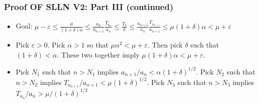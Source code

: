 \documentclass[handout]{beamer}
\newcommand{\BP}{\mathbf{P}}
\begin{document}
\frame
{
  \frametitle{Proof OF SLLN V2: Part III (continued)}

   \begin{itemize}
        
  \item<1->[-] Goal:       $\mu - \varepsilon \le \frac{\mu}{(1+\delta)\alpha} \le \frac{a_n}{a_{n+1}}\frac{T_{a_n}}{a_{n}} \leq \frac{T_{k}}{k}\leq  \frac{a_{n+1}}{a_{n}}\frac{T_{a_{n+1}}}{a_{n+1}} \le \mu(1+\delta)\alpha < \mu + \varepsilon$
  
  \item<2->[-] Pick $\varepsilon > 0$. Pick $\alpha > 1$ so that $\mu\alpha^2 < \mu + \varepsilon$. Then pick $\delta$ such that $(1 + \delta) < \alpha$. These two together imply $\mu(1+\delta)\alpha < \mu + \varepsilon$.
 
  \item<3->[-] Pick $N_1$ such that $n > N_1$ implies $a_{n+1}/a_n < \alpha(1+\delta)^{1/2}$. Pick $N_2$ such that $n > N_2$ implies $T_{a_{n+1}}/a_{n+1} < \mu(1+\delta)^{1/2}$. Pick $N_3$ such that $n > N_3$ implies $T_{a_{n}}/a_{n} > \mu / (1+\delta)^{1/2}$
  


%  
                                            
\end{itemize}
}
\end{document}
